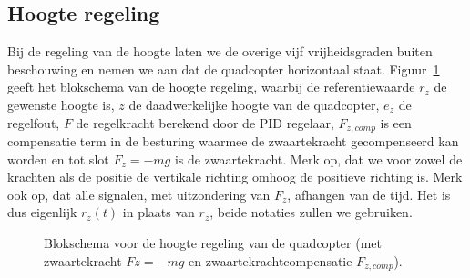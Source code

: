 \documentclass[a4paper,11pt]{article}
\begin{document}
\subsection{Hoogte regeling}
Bij de regeling van de hoogte laten we de overige vijf vrijheidsgraden buiten beschouwing en nemen we aan dat de quadcopter horizontaal staat. Figuur~\ref{fig:blokschema_hoogte} geeft het blokschema van de hoogte regeling, waarbij de referentiewaarde $r_z$ de gewenste hoogte is, $z$ de daadwerkelijke hoogte van de quadcopter, $e_z$ de regelfout, $F$ de regelkracht berekend door de PID regelaar, $F_{z,comp}$ is een compensatie term in de besturing waarmee de zwaartekracht gecompenseerd kan worden en tot slot $F_z=-mg$ is de zwaartekracht. Merk op, dat we voor zowel de krachten als de positie de vertikale richting omhoog de positieve richting is. Merk ook op, dat alle signalen, met uitzondering van $F_z$, afhangen van de tijd. Het is dus eigenlijk $r_z(t)$ in plaats van $r_z$, beide notaties zullen we gebruiken.
\begin{figure}
\centering
{}
\caption{Blokschema voor de hoogte regeling van de quadcopter (met zwaartekracht $Fz=-mg$ en zwaartekrachtcompensatie $F_{z,comp}$).}
\label{fig:blokschema_hoogte}
\end{figure}
\end{document}
